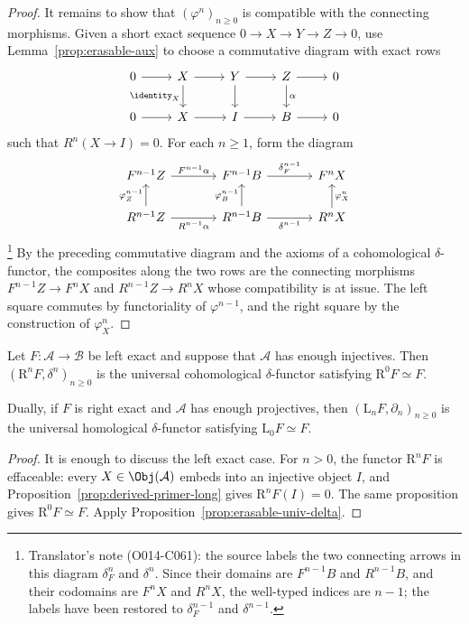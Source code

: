 \begin{proof}
	It remains to show that $(\varphi^n)_{n\geq0}$ is compatible with the
	connecting morphisms. Given a short exact sequence
	$0\to X\to Y\to Z\to0$, use Lemma~\ref{prop:erasable-aux} to choose a
	commutative diagram with exact rows
	\[\begin{tikzcd}
		0 \arrow[r] & X \arrow[d, "\identity_X"'] \arrow[r] & Y \arrow[r] \arrow[d] & Z \arrow[d, "\alpha"] \arrow[r] & 0 \\
		0 \arrow[r] & X \arrow[r] & I \arrow[r] & B \arrow[r] & 0
	\end{tikzcd}\]
	such that $R^n(X\to I)=0$. For each $n\geq1$, form the diagram
	\[\begin{tikzcd}[column sep=large]
		F^{n-1} Z \arrow[r, "{F^{n-1}\alpha}"] & F^{n-1} B \arrow[r, "{\delta_F^{n-1}}"] & F^n X \\
		R^{n-1} Z \arrow[u, "{\varphi_Z^{n-1}}"] \arrow[r, "{R^{n-1}\alpha}"'] & R^{n-1} B \arrow[u, "{\varphi_B^{n-1}}"] \arrow[r, "{\delta^{n-1}}"'] & R^n X \arrow[u, "{\varphi_X^n}"']
	\end{tikzcd}\]%
	\footnote{Translator's note (O014-C061): the source labels the two
	connecting arrows in this diagram $\delta_F^n$ and $\delta^n$. Since their
	domains are $F^{n-1}B$ and $R^{n-1}B$, and their codomains are $F^nX$ and
	$R^nX$, the well-typed indices are $n-1$; the labels have been restored to
	$\delta_F^{n-1}$ and $\delta^{n-1}$.}
	By the preceding commutative diagram and the axioms of a cohomological
	$\delta$-functor, the composites along the two rows are the connecting
	morphisms $F^{n-1}Z\to F^nX$ and $R^{n-1}Z\to R^nX$ whose compatibility
	is at issue. The left square commutes by functoriality of
	$\varphi^{n-1}$, and the right square by the construction of
	$\varphi_X^n$.
\end{proof}

\begin{corollary}\label{prop:derived-erasable}
	Let $F:\mathcal{A}\to\mathcal{B}$ be left exact and suppose that
	$\mathcal{A}$ has enough injectives. Then
	$(\mathrm{R}^nF,\delta^n)_{n\geq0}$ is the universal cohomological
	$\delta$-functor satisfying $\mathrm{R}^0F\simeq F$.

	Dually, if $F$ is right exact and $\mathcal{A}$ has enough projectives,
	then $(\mathrm{L}_nF,\partial_n)_{n\geq0}$ is the universal homological
	$\delta$-functor satisfying $\mathrm{L}_0F\simeq F$.
\end{corollary}
\begin{proof}
	It is enough to discuss the left exact case. For $n>0$, the functor
	$\mathrm{R}^nF$ is effaceable: every $X\in\Obj(\mathcal{A})$ embeds into
	an injective object $I$, and Proposition~\ref{prop:derived-primer-long}
	gives $\mathrm{R}^nF(I)=0$. The same proposition gives
	$\mathrm{R}^0F\simeq F$. Apply Proposition~\ref{prop:erasable-univ-delta}.
\end{proof}
